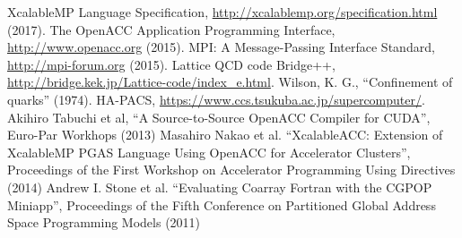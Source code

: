 \documentclass[graybox]{svmult}
\def\XMP{XcalableMP}
\def\XMP{XMP}
\begin{document}



\begin{thebibliography}{99}
  XcalableMP Language Specification, \url{http://xcalablemp.org/specification.html} (2017).
  The OpenACC Application Programming Interface, \url{http://www.openacc.org} (2015).
  MPI: A Message-Passing Interface Standard, \url{http://mpi-forum.org} (2015).
  Lattice QCD code Bridge++, \url{http://bridge.kek.jp/Lattice-code/index\_e.html}.
  Wilson, K. G., ``Confinement of quarks'' (1974).
  HA-PACS, \url{https://www.ccs.tsukuba.ac.jp/supercomputer/}.
  Akihiro Tabuchi et al, ``A Source-to-Source OpenACC Compiler for CUDA'', Euro-Par Workhops (2013)
  Masahiro Nakao et al. ``XcalableACC: Extension of XcalableMP PGAS Language Using OpenACC for Accelerator Clusters'',
   Proceedings of the First Workshop on Accelerator Programming Using Directives (2014)
  Andrew I. Stone et al. ``Evaluating Coarray Fortran with the CGPOP Miniapp'',
   Proceedings of the Fifth Conference on Partitioned Global Address Space Programming Models (2011)
\end{thebibliography}
\end{document}
